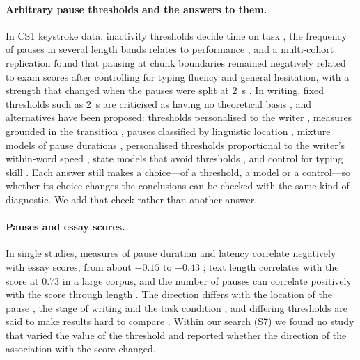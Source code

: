 \paragraph{Arbitrary pause thresholds and the answers to them.} In CS1 keystroke data, inactivity thresholds decide time
on task \cite{hart2023time,hart2025time,edwards2022engagement}, the frequency of pauses in several length bands relates to
performance \cite{shrestha2022pausing}, and a multi-cohort replication found that pausing at chunk boundaries remained
negatively related to exam scores after controlling for typing fluency and general hesitation, with a strength that
changed when the pauses were split at 2~s \cite{koutcheme2026keystroke}. In writing, fixed thresholds such as 2~s are
criticised as having no theoretical basis \cite{torrance2024methods,roeser2024disfluencies}, and alternatives have been
proposed: thresholds personalised to the writer \cite{chukharev2014pauses}, measures grounded in the transition
\cite{hall2024constructing}, pauses classified by linguistic location \cite{medimorec2017pauses}, mixture models of
pause durations \cite{baaijen2012keystroke,almond2012preliminary,li2021mixture,litvinova2024investigating}, personalised
thresholds proportional to the writer's within-word speed \cite{guo2020scenario}, state models
that avoid thresholds \cite{garcesmanzanera2026modeling}, and control for typing skill \cite{alves2007typing}. Each
answer still makes a choice---of a threshold, a model or a control---so whether its choice changes the conclusions can
be checked with the same kind of diagnostic. We add that check rather than another answer.

\paragraph{Pauses and essay scores.} In single studies, measures of pause duration and latency correlate negatively
with essay scores, from about $-0.15$ to $-0.43$ \cite{li2026bayesian,zhang2015process,schaller2026keyscore,li2021mixture};
text length correlates with the score at 0.73 in a large corpus, and the number of pauses can correlate
positively with the score through length \cite{schaller2026keyscore}. The direction differs with the location of the
pause \cite{zhang2015process}, the stage of writing \cite{xu2014pauses} and the task condition
\cite{schaller2026keyscore}, and differing thresholds are said to make results hard to compare \cite{xu2014pauses}.
Within our search (S7) we found no study that varied the value of the threshold and reported whether the direction of
the association with the score changed.


